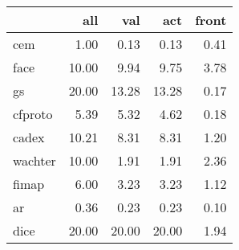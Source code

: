\begin{tabular}{lrrrr}
\hline
{}                  &    all &    val &    act &  front \\ \hline
\hline
cem                 &   1.00 &   0.13 &   0.13 &   0.41 \\ \hline
face                &  10.00 &   9.94 &   9.75 &   3.78 \\ \hline
gs                  &  20.00 &  13.28 &  13.28 &   0.17 \\ \hline
cfproto             &   5.39 &   5.32 &   4.62 &   0.18 \\ \hline
cadex               &  10.21 &   8.31 &   8.31 &   1.20 \\ \hline
wachter             &  10.00 &   1.91 &   1.91 &   2.36 \\ \hline
fimap               &   6.00 &   3.23 &   3.23 &   1.12 \\ \hline
ar                  &   0.36 &   0.23 &   0.23 &   0.10 \\ \hline
dice                &  20.00 &  20.00 &  20.00 &   1.94 \\ \hline
\hline
\end{tabular}
